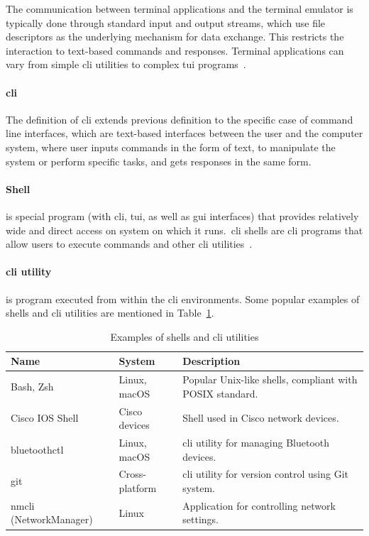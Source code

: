 The communication between terminal applications and the terminal emulator is
typically done through standard input and output streams, which use file
descriptors as the underlying mechanism for data exchange. This restricts the
interaction to text-based commands and responses. Terminal applications can vary
from simple \gls{cli} utilities to complex \gls{tui}
programs~\cite{linfo_terminal}.

\paragraph{\gls{cli}}
The definition of \gls{cli} extends previous definition to the specific case of
command line interfaces, which are text-based interfaces between the user and
the computer system, where user inputs commands in the form of text, to
manipulate the system or perform specific tasks, and gets responses in the same
form.

\paragraph{Shell}
is special program (with \gls{cli}, \gls{tui}, as well as
\gls{gui} interfaces) that provides relatively wide and direct access on system
on which it runs.\ \gls{cli} shells are \gls{cli} programs that allow users to
execute commands and other \gls{cli} utilities~\cite{linfo_terminal}.

\paragraph{\gls{cli} utility}
is program executed from within the \gls{cli} environments. Some popular
examples of shells and \gls{cli} utilities are mentioned in Table~\ref{t:utils}.

\begin{table}
  \caption{Examples of shells and \gls{cli} utilities}\label{t:utils}
    \begin{tabularx}{\textwidth}{lXX}
    \toprule
    Name & System & Description \\
    \midrule
    Bash, Zsh
    & Linux, macOS
    & Popular Unix-like shells, compliant with POSIX standard.\\
    Cisco IOS Shell
    & Cisco devices
    & Shell used in Cisco network devices. \\
    bluetoothctl
    & Linux, macOS
    & \gls{cli} utility for managing Bluetooth devices.\\
    git
    & Cross-platform
    & \gls{cli} utility for version control using Git system. \\
    nmcli (NetworkManager)
    & Linux
    & Application for controlling network settings. \\
    \bottomrule
  \end{tabularx}
\end{table}

